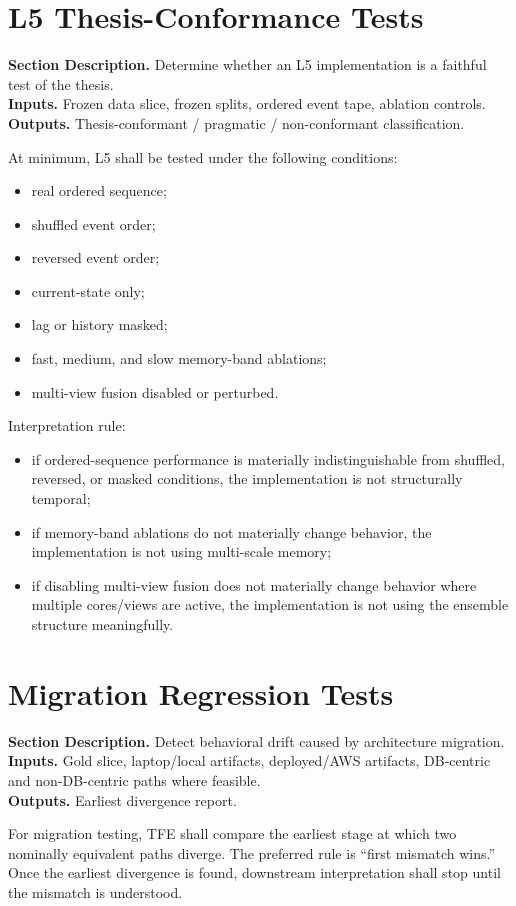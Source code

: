 \documentclass[11pt]{report}
\newcommand{\meta}[3]{\textbf{Section Description.} #1\\
\textbf{Inputs.} #2\\
\textbf{Outputs.} #3\par}
\begin{document}
\section{L5 Thesis-Conformance Tests}
\meta{Determine whether an L5 implementation is a faithful test of the thesis.}{Frozen data slice, frozen splits, ordered event tape, ablation controls.}{Thesis-conformant / pragmatic / non-conformant classification.}

At minimum, L5 shall be tested under the following conditions:
\begin{itemize}
    \item real ordered sequence;
    \item shuffled event order;
    \item reversed event order;
    \item current-state only;
    \item lag or history masked;
    \item fast, medium, and slow memory-band ablations;
    \item multi-view fusion disabled or perturbed.
\end{itemize}

Interpretation rule:
\begin{itemize}
    \item if ordered-sequence performance is materially indistinguishable from shuffled, reversed, or masked conditions, the implementation is not structurally temporal;
    \item if memory-band ablations do not materially change behavior, the implementation is not using multi-scale memory;
    \item if disabling multi-view fusion does not materially change behavior where multiple cores/views are active, the implementation is not using the ensemble structure meaningfully.
\end{itemize}

\section{Migration Regression Tests}
\meta{Detect behavioral drift caused by architecture migration.}{Gold slice, laptop/local artifacts, deployed/AWS artifacts, DB-centric and non-DB-centric paths where feasible.}{Earliest divergence report.}

For migration testing, TFE shall compare the earliest stage at which two nominally equivalent paths diverge. The preferred rule is ``first mismatch wins.'' Once the earliest divergence is found, downstream interpretation shall stop until the mismatch is understood.
\end{document}
